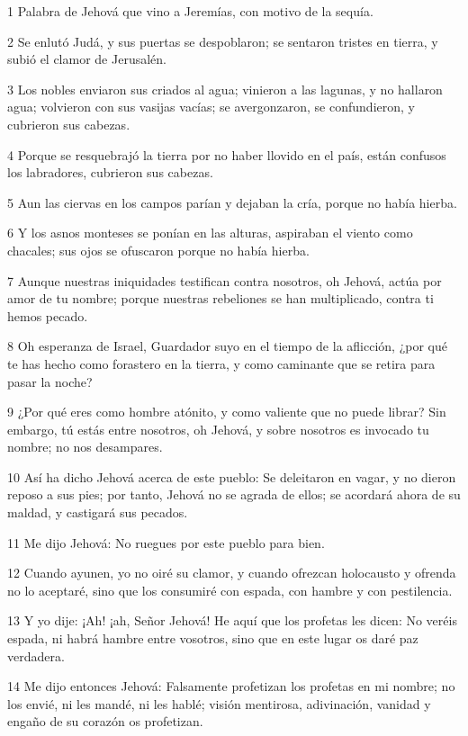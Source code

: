 \par 1 Palabra de Jehová que vino a Jeremías, con motivo de la sequía.
\par 2 Se enlutó Judá, y sus puertas se despoblaron; se sentaron tristes en tierra, y subió el clamor de Jerusalén.
\par 3 Los nobles enviaron sus criados al agua; vinieron a las lagunas, y no hallaron agua; volvieron con sus vasijas vacías; se avergonzaron, se confundieron, y cubrieron sus cabezas.
\par 4 Porque se resquebrajó la tierra por no haber llovido en el país, están confusos los labradores, cubrieron sus cabezas.
\par 5 Aun las ciervas en los campos parían y dejaban la cría, porque no había hierba.
\par 6 Y los asnos monteses se ponían en las alturas, aspiraban el viento como chacales; sus ojos se ofuscaron porque no había hierba.
\par 7 Aunque nuestras iniquidades testifican contra nosotros, oh Jehová, actúa por amor de tu nombre; porque nuestras rebeliones se han multiplicado, contra ti hemos pecado.
\par 8 Oh esperanza de Israel, Guardador suyo en el tiempo de la aflicción, ¿por qué te has hecho como forastero en la tierra, y como caminante que se retira para pasar la noche?
\par 9 ¿Por qué eres como hombre atónito, y como valiente que no puede librar? Sin embargo, tú estás entre nosotros, oh Jehová, y sobre nosotros es invocado tu nombre; no nos desampares.
\par 10 Así ha dicho Jehová acerca de este pueblo: Se deleitaron en vagar, y no dieron reposo a sus pies; por tanto, Jehová no se agrada de ellos; se acordará ahora de su maldad, y castigará sus pecados.
\par 11 Me dijo Jehová: No ruegues por este pueblo para bien.
\par 12 Cuando ayunen, yo no oiré su clamor, y cuando ofrezcan holocausto y ofrenda no lo aceptaré, sino que los consumiré con espada, con hambre y con pestilencia.
\par 13 Y yo dije: ¡Ah! ¡ah, Señor Jehová! He aquí que los profetas les dicen: No veréis espada, ni habrá hambre entre vosotros, sino que en este lugar os daré paz verdadera.
\par 14 Me dijo entonces Jehová: Falsamente profetizan los profetas en mi nombre; no los envié, ni les mandé, ni les hablé; visión mentirosa, adivinación, vanidad y engaño de su corazón os profetizan.
